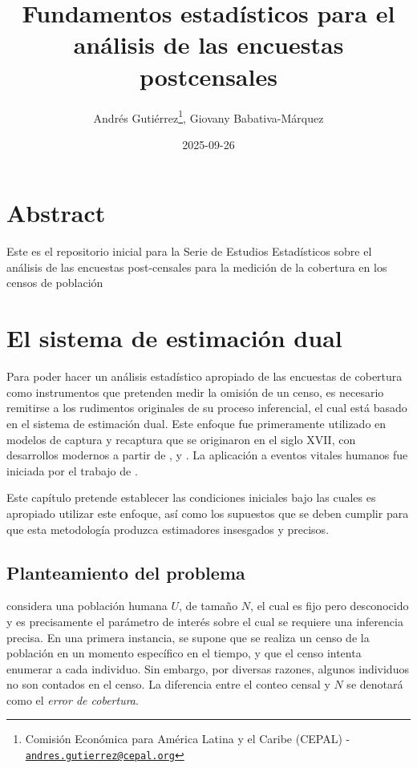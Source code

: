 \documentclass[
  12pt,
]{book}
\title{Fundamentos estadísticos para el análisis de las encuestas postcensales}
\author{Andrés Gutiérrez\footnote{Comisión Económica para América Latina y el Caribe (CEPAL) - \href{mailto:andres.gutierrez@cepal.org}{\nolinkurl{andres.gutierrez@cepal.org}}}, Giovany Babativa-Márquez}
\date{2025-09-26}
\begin{document}
\maketitle

{
\hypersetup{linkcolor=}
\setcounter{tocdepth}{0}
\tableofcontents
}
\listoffigures
\listoftables
\chapter*{Abstract}\label{abstract}

Este es el repositorio inicial para la Serie de Estudios Estadísticos sobre el análisis de las encuestas post-censales para la medición de la cobertura en los censos de población

\chapter{El sistema de estimación dual}\label{cap-dual}

Para poder hacer un análisis estadístico apropiado de las encuestas de cobertura como instrumentos que pretenden medir la omisión de un censo, es necesario remitirse a los rudimentos originales de su proceso inferencial, el cual está basado en el sistema de estimación dual. Este enfoque fue primeramente utilizado en modelos de captura y recaptura que se originaron en el siglo XVII, con desarrollos modernos a partir de \citet{petersen1896}, \citet{lincoln1930} y \citet{schnabel1938}. La aplicación a eventos vitales humanos fue iniciada por el trabajo de \citet{sekar1949}.

Este capítulo pretende establecer las condiciones iniciales bajo las cuales es apropiado utilizar este enfoque, así como los supuestos que se deben cumplir para que esta metodología produzca estimadores insesgados y precisos.

\section{Planteamiento del problema}\label{planteamiento-del-problema}

\citet{wolter1986coverage} considera una población humana \(U\), de tamaño \(N\), el cual es fijo pero desconocido y es precisamente el parámetro de interés sobre el cual se requiere una inferencia precisa. En una primera instancia, se supone que se realiza un censo de la población en un momento específico en el tiempo, y que el censo intenta enumerar a cada individuo. Sin embargo, por diversas razones, algunos individuos no son contados en el censo. La diferencia entre el conteo censal y \(N\) se denotará como el \emph{error de cobertura}.
\end{document}
